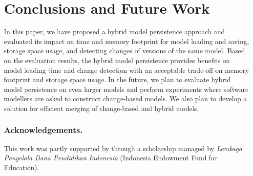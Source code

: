 \documentclass{llncs}
\begin{document}
\vspace{-10pt}
\section{Conclusions and Future Work}
\label{sec:conlcusions_and_future_work}

\vspace{-10pt}
In this paper, we have proposed a hybrid model persistence approach and evaluated its impact on time and memory footprint for model loading and saving, storage space usage, and detecting changes of versions of the same model. Based on the evaluation results, the hybrid model persistence provides benefits on model loading time and change detection with an acceptable trade-off on memory footprint and storage space usage. In the future, we plan to evaluate hybrid model persistence on even larger models and perform experiments where software modellers are asked to construct change-based models. We also plan to develop a solution for efficient merging of change-based and hybrid models. 

\vspace{-10pt}
\subsubsection*{Acknowledgements.} This work was partly supported by through a scholarship managed by \emph{Lembaga Pengelola Dana Pendidikan Indonesia} (Indonesia Endowment Fund for Education).

 

\end{document}
